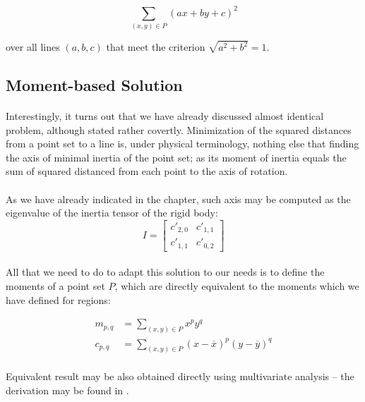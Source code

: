 \[
	\sum_{(x,y) \in P} (ax + by + c)^2
\]

over all lines $(a,b,c)$ that meet the criterion $\sqrt{a^2 + b^2} = 1$.

\subsection{Moment-based Solution}

\paragraph*{}
Interestingly, it turns out that we have already discussed almost identical problem, although stated rather covertly. Minimization of the squared distances from a point set to a line is, under physical terminology, nothing else that finding the axis of minimal inertia of the point set; as its moment of inertia equals the sum of squared distanced from each point to the axis of rotation.

\paragraph*{}
As we have already indicated in the  chapter, such axis may be computed as the eigenvalue of the inertia tensor of the rigid body:
\[
I = \begin{bmatrix}
c'_{2,0} & c'_{1,1}\\
c'_{1,1} & c'_{0,2}
\end{bmatrix}
\]

\paragraph*{}
All that we need to do to adapt this solution to our needs is to define the moments of a point set $P$, which are directly equivalent to the moments which we have defined for regions:

\begin{align*}
	m_{p,q} &= \sum_{(x,y) \in P} {x}^p {y}^q \\
	c_{p,q} &= \sum_{(x,y) \in P} ({x}-\overline{x})^p ({y}-\overline{y})^q
\end{align*}

\paragraph*{}
Equivalent result may be also obtained directly using multivariate analysis -- the derivation may be found in \cite[p.~588-591]{Haralick92}.

